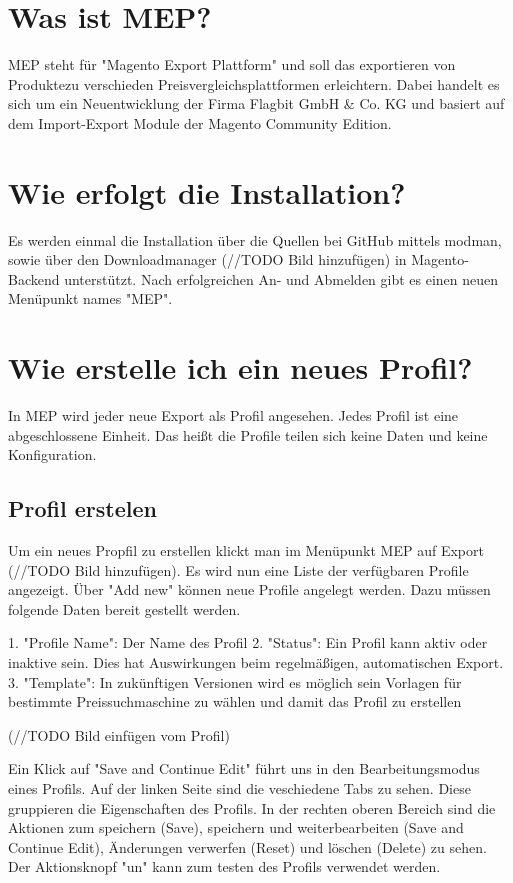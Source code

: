 \documentclass[a4paper]{article}
\begin{document}
\section{Was ist MEP?}
MEP steht für "Magento Export Plattform" und soll das exportieren von
Produktezu verschieden Preisvergleichsplattformen erleichtern. Dabei 
handelt es sich um ein Neuentwicklung der Firma Flagbit GmbH \& Co. KG 
und basiert auf dem Import-Export Module der Magento Community Edition.

\section{Wie erfolgt die Installation?}
Es werden einmal die Installation über die Quellen bei GitHub mittels 
modman, sowie über den Downloadmanager (//TODO Bild hinzufügen) in 
Magento-Backend unterstützt.  Nach erfolgreichen An- und Abmelden gibt 
es einen neuen Menüpunkt names "MEP".

\section{Wie erstelle ich ein neues Profil?}
In MEP wird jeder neue Export als Profil angesehen. Jedes Profil ist 
eine abgeschlossene Einheit. Das heißt die Profile teilen sich keine 
Daten und keine Konfiguration.

\subsection{Profil erstelen}
Um ein neues Propfil zu erstellen klickt man im Menüpunkt MEP auf 
Export (//TODO Bild hinzufügen). Es wird nun eine Liste der verfügbaren 
Profile angezeigt. Über "Add new" können neue Profile angelegt 
werden. Dazu müssen folgende Daten bereit gestellt werden.

1. "Profile Name": Der Name des Profil
2. "Status": Ein Profil kann aktiv oder inaktive sein. Dies hat 
Auswirkungen beim regelmäßigen, automatischen Export.
3. "Template": In zukünftigen Versionen wird es möglich sein Vorlagen 
für bestimmte Preissuchmaschine zu wählen und damit das Profil zu 
erstellen


(//TODO Bild einfügen vom Profil)


Ein Klick auf "Save and Continue Edit" führt uns in den 
Bearbeitungsmodus eines Profils. Auf der linken Seite sind die 
veschiedene Tabs zu sehen. Diese gruppieren die Eigenschaften des 
Profils. In der rechten oberen Bereich sind die Aktionen zum 
speichern (Save), speichern und weiterbearbeiten (Save and Continue 
Edit), Änderungen verwerfen (Reset) und löschen (Delete) zu sehen. 
Der Aktionsknopf "un" kann zum testen des Profils verwendet werden. 
\end{document}
